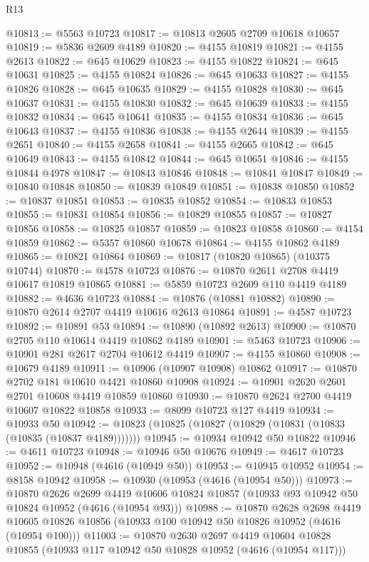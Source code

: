 \begin{lexlean}{R13}
\begin{coremodule}
@10813 := @5563 @10723
@10817 := @10813 @2605 @2709 @10618 @10657
@10819 := @5836 @2609 @4189
@10820 := @4155 @10819
@10821 := @4155 @2613
@10822 := @645 @10629
@10823 := @4155 @10822
@10824 := @645 @10631
@10825 := @4155 @10824
@10826 := @645 @10633
@10827 := @4155 @10826
@10828 := @645 @10635
@10829 := @4155 @10828
@10830 := @645 @10637
@10831 := @4155 @10830
@10832 := @645 @10639
@10833 := @4155 @10832
@10834 := @645 @10641
@10835 := @4155 @10834
@10836 := @645 @10643
@10837 := @4155 @10836
@10838 := @4155 @2644
@10839 := @4155 @2651
@10840 := @4155 @2658
@10841 := @4155 @2665
@10842 := @645 @10649
@10843 := @4155 @10842
@10844 := @645 @10651
@10846 := @4155 @10844 @4978
@10847 := @10843 @10846
@10848 := @10841 @10847
@10849 := @10840 @10848
@10850 := @10839 @10849
@10851 := @10838 @10850
@10852 := @10837 @10851
@10853 := @10835 @10852
@10854 := @10833 @10853
@10855 := @10831 @10854
@10856 := @10829 @10855
@10857 := @10827 @10856
@10858 := @10825 @10857
@10859 := @10823 @10858
@10860 := @4154 @10859
@10862 := @5357 @10860 @10678
@10864 := @4155 @10862 @4189
@10865 := @10821 @10864
@10869 := @10817 (@10820 @10865) (@10375 @10744)
@10870 := @4578 @10723
@10876 := @10870 @2611 @2708 @4419 @10617 @10819 @10865
@10881 := @5859 @10723 @2609 @110 @4419 @4189
@10882 := @4636 @10723
@10884 := @10876 (@10881 @10882)
@10890 := @10870 @2614 @2707 @4419 @10616 @2613 @10864
@10891 := @4587 @10723
@10892 := @10891 @53
@10894 := @10890 (@10892 @2613)
@10900 := @10870 @2705 @110 @10614 @4419 @10862 @4189
@10901 := @5463 @10723
@10906 := @10901 @281 @2617 @2704 @10612 @4419
@10907 := @4155 @10860
@10908 := @10679 @4189
@10911 := @10906 (@10907 @10908) @10862
@10917 := @10870 @2702 @181 @10610 @4421 @10860 @10908
@10924 := @10901 @2620 @2601 @2701 @10608 @4419 @10859 @10860
@10930 := @10870 @2624 @2700 @4419 @10607 @10822 @10858
@10933 := @8099 @10723 @127 @4419
@10934 := @10933 @50
@10942 := @10823 (@10825 (@10827 (@10829 (@10831 (@10833 (@10835 (@10837 @4189)))))))
@10945 := @10934 @10942 @50 @10822
@10946 := @4611 @10723
@10948 := @10946 @50 @10676
@10949 := @4617 @10723
@10952 := @10948 (@4616 (@10949 @50))
@10953 := @10945 @10952
@10954 := @8158 @10942
@10958 := @10930 (@10953 (@4616 (@10954 @50)))
@10973 := @10870
    @2626
    @2699
    @4419
    @10606
    @10824
    @10857
    (@10933 @93 @10942 @50 @10824 @10952 (@4616 (@10954 @93)))
@10988 := @10870
    @2628
    @2698
    @4419
    @10605
    @10826
    @10856
    (@10933 @100 @10942 @50 @10826 @10952 (@4616 (@10954 @100)))
@11003 := @10870
    @2630
    @2697
    @4419
    @10604
    @10828
    @10855
    (@10933 @117 @10942 @50 @10828 @10952 (@4616 (@10954 @117)))

\end{coremodule}
\end{lexlean}
